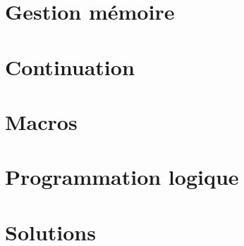 \documentclass[10pt]{scrreprt}
\begin{document}


\chapter{Gestion mémoire}









\chapter{Continuation}


\chapter{Macros}














\chapter{Programmation logique}














\chapter{Solutions}
\shipoutAnswer
\end{document}
